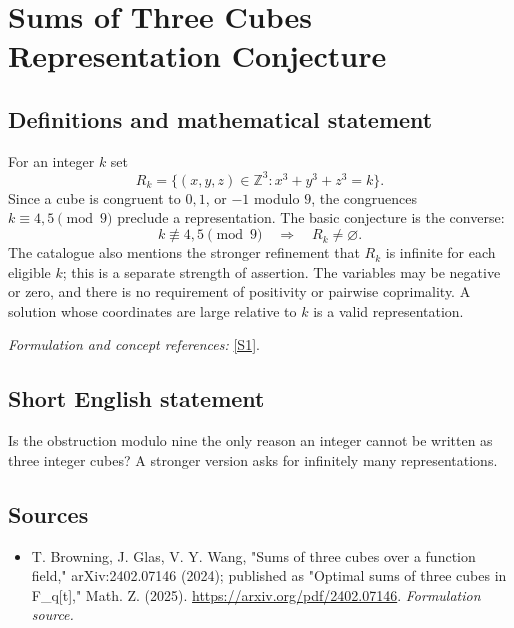 \documentclass[11pt]{article}
\begin{document}
\section*{\texorpdfstring{Sums of Three Cubes Representation Conjecture}{Sums of Three Cubes Representation Conjecture}}\label{statement}
\subsection{Definitions and mathematical statement}
For an integer $k$ set
\[
 R_k=\{(x,y,z)\in{\mathbb{Z}}^3:x^3+y^3+z^3=k\}.
\]
Since a cube is congruent to $0,1$, or $-1$ modulo $9$, the congruences $k\equiv4,5\pmod9$ preclude a representation. The basic conjecture is the converse:
\[
 k\not\equiv4,5\pmod9\quad\Longrightarrow\quad R_k\ne\varnothing.
\]
The catalogue also mentions the stronger refinement that $R_k$ is infinite for each eligible $k$; this is a separate strength of assertion. The variables may be negative or zero, and there is no requirement of positivity or pairwise coprimality. A solution whose coordinates are large relative to $k$ is a valid representation.
\par\smallskip\textit{Formulation and concept references:} \href{https://arxiv.org/pdf/2402.07146}{[S1]}.

\subsection{Short English statement}
Is the obstruction modulo nine the only reason an integer cannot be written as three integer cubes? A stronger version asks for infinitely many representations.
\subsection{Sources}
\begin{itemize}
\item[S1]T. Browning, J. Glas, V. Y. Wang, "Sums of three cubes over a function field," arXiv:2402.07146 (2024); published as "Optimal sums of three cubes in F\_q[t]," Math. Z. (2025).
\url{https://arxiv.org/pdf/2402.07146}.
\textit{Formulation source.}
\end{itemize}
\end{document}
